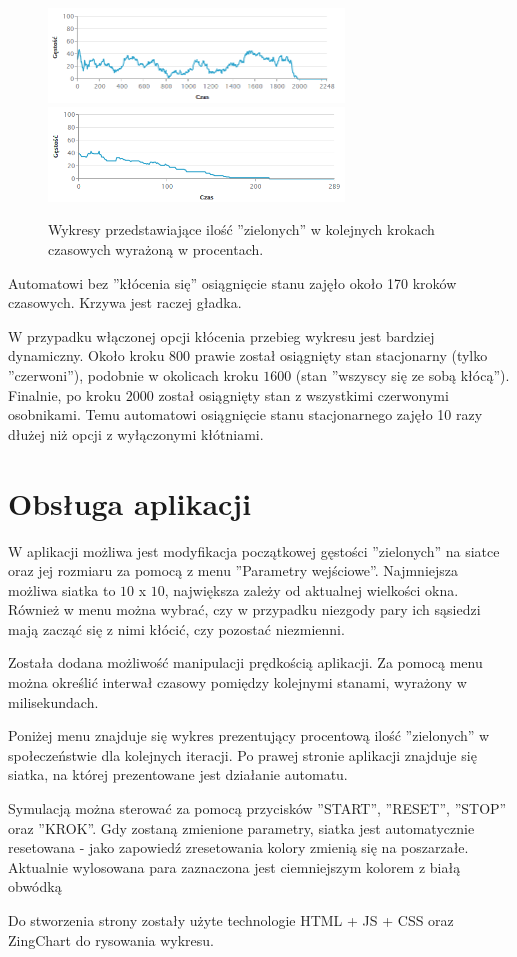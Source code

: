 \documentclass[12pt]{article}
\begin{document}
\begin{figure}[H]
\centering
\includegraphics[width=0.7\textwidth]{stacjonarny_niezgoda_wykres.png} 
\includegraphics[width=0.7\textwidth]{stacjonarny_niezgoda_wykres_bezk.png}
\caption{Wykresy przedstawiające ilość ''zielonych'' w kolejnych krokach czasowych wyrażoną w procentach.}
\end{figure}

Automatowi bez ''kłócenia się'' osiągnięcie stanu zajęło około 170 kroków czasowych. Krzywa jest raczej gładka.

W przypadku włączonej opcji kłócenia przebieg wykresu jest bardziej dynamiczny. Około kroku $800$ prawie został osiągnięty stan stacjonarny (tylko ''czerwoni''), podobnie w okolicach kroku $1600$ (stan ''wszyscy się ze sobą kłócą''). Finalnie, po kroku $2000$ został osiągnięty stan z wszystkimi czerwonymi osobnikami. Temu automatowi osiągnięcie stanu stacjonarnego zajęło 10 razy dłużej niż opcji z wyłączonymi kłótniami.

\section{Obsługa aplikacji}
W aplikacji możliwa jest modyfikacja początkowej gęstości ''zielonych'' na siatce oraz jej rozmiaru za pomocą z menu ''Parametry wejściowe''. Najmniejsza możliwa siatka to $10$ x $10$, największa zależy od aktualnej wielkości okna. Również w menu można wybrać, czy w przypadku niezgody pary ich sąsiedzi mają zacząć się z nimi kłócić, czy pozostać niezmienni.

Została dodana możliwość manipulacji prędkością aplikacji. Za pomocą menu można określić interwał czasowy pomiędzy kolejnymi stanami, wyrażony w milisekundach.

Poniżej menu znajduje się wykres prezentujący procentową ilość ''zielonych'' w społeczeństwie dla kolejnych iteracji. Po prawej stronie aplikacji znajduje się siatka, na której prezentowane jest działanie automatu.

Symulacją można sterować za pomocą przycisków ''START'', ''RESET'', ''STOP'' oraz ''KROK''. Gdy zostaną zmienione parametry, siatka jest automatycznie resetowana - jako zapowiedź zresetowania kolory zmienią się na poszarzałe. Aktualnie wylosowana para zaznaczona jest ciemniejszym kolorem z białą obwódką

Do stworzenia strony zostały użyte technologie HTML + JS + CSS oraz ZingChart do rysowania wykresu.
\end{document}
